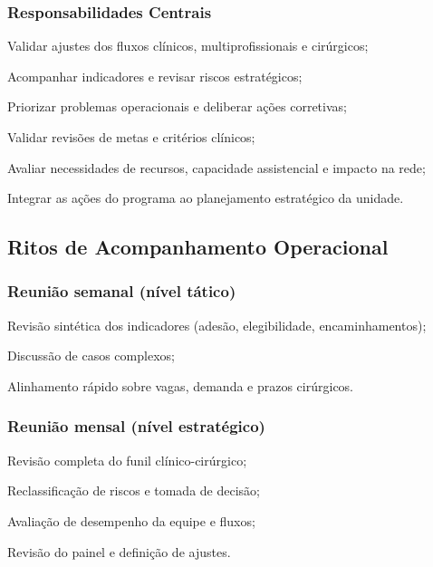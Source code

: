 \documentclass[12pt]{article}
\begin{document}
\subsubsection{Responsabilidades Centrais}
\label{sec:orgd9b3240}
\begin{hlevelthree}
\item Validar ajustes dos fluxos clínicos, multiprofissionais e cirúrgicos;
\item Acompanhar indicadores e revisar riscos estratégicos;
\item Priorizar problemas operacionais e deliberar ações corretivas;
\item Validar revisões de metas e critérios clínicos;
\item Avaliar necessidades de recursos, capacidade assistencial e impacto na rede;
\item Integrar as ações do programa ao planejamento estratégico da unidade.
\end{hlevelthree}

\subsection{Ritos de Acompanhamento Operacional}
\label{sec:org4b12b68}
\subsubsection{Reunião semanal (nível tático)}
\label{sec:org3b3c727}
\begin{hlevelthree}
\item Revisão sintética dos indicadores (adesão, elegibilidade, encaminhamentos);
\item Discussão de casos complexos;
\item Alinhamento rápido sobre vagas, demanda e prazos cirúrgicos.
\end{hlevelthree}

\subsubsection{Reunião mensal (nível estratégico)}
\label{sec:orged35339}
\begin{hlevelthree}
\item Revisão completa do funil clínico-cirúrgico;
\item Reclassificação de riscos e tomada de decisão;
\item Avaliação de desempenho da equipe e fluxos;
\item Revisão do painel e definição de ajustes.
\end{hlevelthree}
\end{document}
